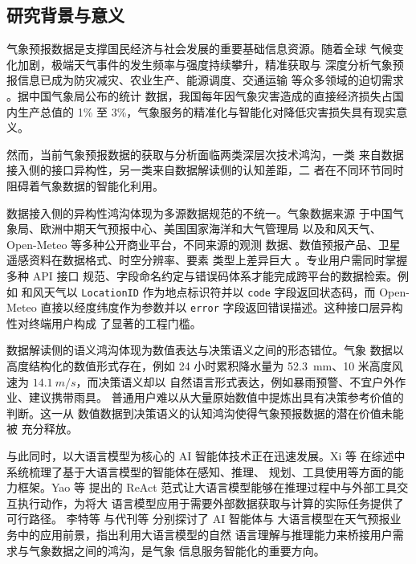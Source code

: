 
\subsection{研究背景与意义}
\label{sec:background}

气象预报数据是支撑国民经济与社会发展的重要基础信息资源。随着全球
气候变化加剧，极端天气事件的发生频率与强度持续攀升，精准获取与
深度分析气象预报信息已成为防灾减灾、农业生产、能源调度、交通运输
等众多领域的迫切需求 \cite{ref2, ref5}。据中国气象局公布的统计
数据，我国每年因气象灾害造成的直接经济损失占国内生产总值的 1\%
至 3\%，气象服务的精准化与智能化对降低灾害损失具有现实意义。

然而，当前气象预报数据的获取与分析面临两类深层次技术鸿沟，一类
来自数据接入侧的接口异构性，另一类来自数据解读侧的认知差距，二
者在不同环节同时阻碍着气象数据的智能化利用。

数据接入侧的异构性鸿沟体现为多源数据规范的不统一。气象数据来源
于中国气象局、欧洲中期天气预报中心、美国国家海洋和大气管理局
以及和风天气、Open-Meteo 等多种公开商业平台，不同来源的观测
数据、数值预报产品、卫星遥感资料在数据格式、时空分辨率、要素
类型上差异巨大 \cite{ref25}。专业用户需同时掌握多种 API 接口
规范、字段命名约定与错误码体系才能完成跨平台的数据检索。例如
和风天气以 \texttt{LocationID} 作为地点标识符并以 \texttt{code}
字段返回状态码，而 Open-Meteo 直接以经度纬度作为参数并以
\texttt{error} 字段返回错误描述。这种接口层异构性对终端用户构成
了显著的工程门槛。

数据解读侧的语义鸿沟体现为数值表达与决策语义之间的形态错位。气象
数据以高度结构化的数值形式存在，例如 24 小时累积降水量为
\SI{52.3}{mm}、10 米高度风速为 $\SI{14.1}{m/s}$，而决策语义却以
自然语言形式表达，例如暴雨预警、不宜户外作业、建议携带雨具。
普通用户难以从大量原始数值中提炼出具有决策参考价值的判断。这一从
数值数据到决策语义的认知鸿沟使得气象预报数据的潜在价值未能被
充分释放。

与此同时，以大语言模型为核心的 AI 智能体技术正在迅速发展。Xi 等
\cite{ref10} 在综述中系统梳理了基于大语言模型的智能体在感知、推理、
规划、工具使用等方面的能力框架。Yao 等 \cite{ref18} 提出的 ReAct
范式让大语言模型能够在推理过程中与外部工具交互执行动作，为将大
语言模型应用于需要外部数据获取与计算的实际任务提供了可行路径。
李特等 \cite{ref2} 与代刊等 \cite{ref5} 分别探讨了 AI 智能体与
大语言模型在天气预报业务中的应用前景，指出利用大语言模型的自然
语言理解与推理能力来桥接用户需求与气象数据之间的鸿沟，是气象
信息服务智能化的重要方向。

